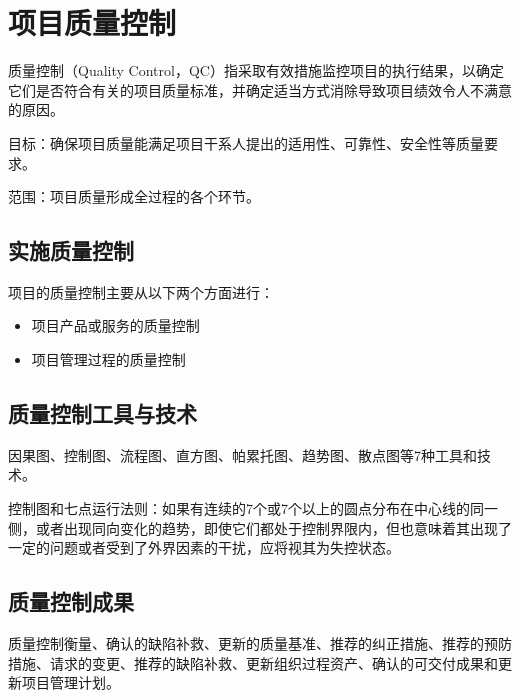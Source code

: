 \section{项目质量控制}
质量控制（Quality Control，QC）指采取有效措施监控项目的执行结果，以确定它们是否符合有关的项目质量标准，并确定适当方式消除导致项目绩效令人不满意的原因。
\par 目标：确保项目质量能满足项目干系人提出的适用性、可靠性、安全性等质量要求。
\par 范围：项目质量形成全过程的各个环节。
\subsection{实施质量控制}
项目的质量控制主要从以下两个方面进行：
\begin{itemize}
	\item 项目产品或服务的质量控制
	\item 项目管理过程的质量控制
\end{itemize}
\subsection{质量控制工具与技术}
因果图、控制图、流程图、直方图、帕累托图、趋势图、散点图等7种工具和技术。
\par 控制图和七点运行法则：如果有连续的7个或7个以上的圆点分布在中心线的同一侧，或者出现同向变化的趋势，即使它们都处于控制界限内，但也意味着其出现了一定的问题或者受到了外界因素的干扰，应将视其为失控状态。 
\subsection{质量控制成果}
质量控制衡量、确认的缺陷补救、更新的质量基准、推荐的纠正措施、推荐的预防措施、请求的变更、推荐的缺陷补救、更新组织过程资产、确认的可交付成果和更新项目管理计划。